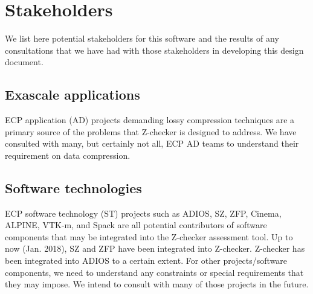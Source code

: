 \section{Stakeholders}

We list here potential stakeholders for this software and the results of any consultations that we have had with those stakeholders in developing this design document.

\subsection{Exascale applications}

ECP application (AD) projects demanding lossy compression techniques are a primary source of the problems that Z-checker is designed to address.
We have consulted with many, but certainly not all, ECP AD teams to understand their requirement on data compression.

\subsection{Software technologies}

ECP software technology (ST) projects such as ADIOS, SZ, ZFP, Cinema, ALPINE, VTK-m, and Spack
are all potential contributors of software components that may be integrated into the Z-checker assessment tool. 
Up to now (Jan. 2018), SZ and ZFP have been integrated into Z-checker. Z-checker has been integrated into ADIOS to a certain extent. 
For other projects/software components, we need to understand any constraints or special requirements that they may impose.
We intend to consult with many of those projects in the future.


